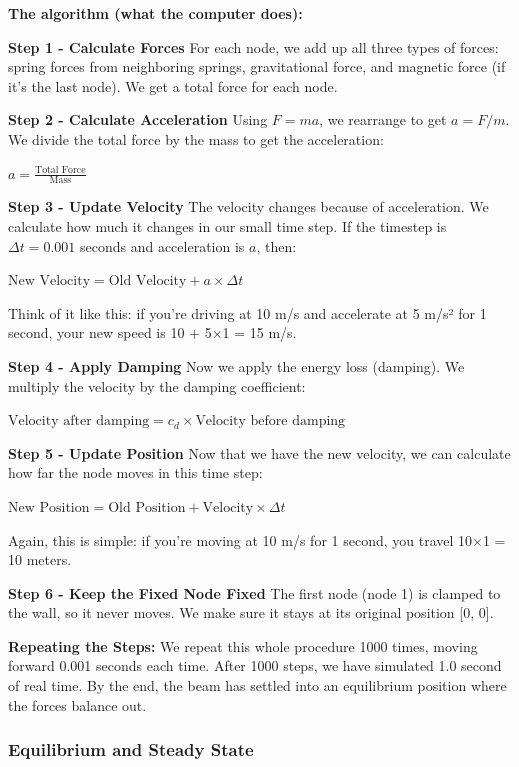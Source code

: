 \documentclass[11pt]{article}
\begin{document}
\textbf{The algorithm (what the computer does):}

\textbf{\textbf{Step 1 - Calculate Forces}}
For each node, we add up all three types of forces: spring forces from neighboring springs, gravitational force, and magnetic force (if it's the last node). We get a total force for each node.

\textbf{\textbf{Step 2 - Calculate Acceleration}}
Using \(F = ma\), we rearrange to get \(a = F/m\). We divide the total force by the mass to get the acceleration:

\(a = \frac{\text{Total Force}}{\text{Mass}}\)

\textbf{\textbf{Step 3 - Update Velocity}}
The velocity changes because of acceleration. We calculate how much it changes in our small time step. If the timestep is \(\Delta t = 0.001\) seconds and acceleration is \(a\), then:

\(\text{New Velocity} = \text{Old Velocity} + a \times \Delta t\)

Think of it like this: if you're driving at 10 m/s and accelerate at 5 m/s² for 1 second, your new speed is 10 + 5×1 = 15 m/s.

\textbf{\textbf{Step 4 - Apply Damping}}
Now we apply the energy loss (damping). We multiply the velocity by the damping coefficient:

\(\text{Velocity after damping} = c_d \times \text{Velocity before damping}\)

\textbf{\textbf{Step 5 - Update Position}}
Now that we have the new velocity, we can calculate how far the node moves in this time step:

\(\text{New Position} = \text{Old Position} + \text{Velocity} \times \Delta t\)

Again, this is simple: if you're moving at 10 m/s for 1 second, you travel 10×1 = 10 meters.

\textbf{\textbf{Step 6 - Keep the Fixed Node Fixed}}
The first node (node 1) is clamped to the wall, so it never moves. We make sure it stays at its original position [0, 0].

\textbf{Repeating the Steps:}
We repeat this whole procedure 1000 times, moving forward 0.001 seconds each time. After 1000 steps, we have simulated 1.0 second of real time. By the end, the beam has settled into an equilibrium position where the forces balance out.
\subsubsection{Equilibrium and Steady State}
\label{sec:org44e0cf9}
\end{document}
